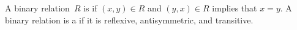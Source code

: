 \documentclass{ibl}  %
\begin{document}
\begin{problem}
\end{problem}

\begin{df}
A binary relation~$R$ is  if
$(x,y)\in R$ and $(y,x)\in R$ implies that $x=y$.
A binary relation is a  if it is 
reflexive, antisymmetric, and transitive.  
\end{df}
\end{document}
